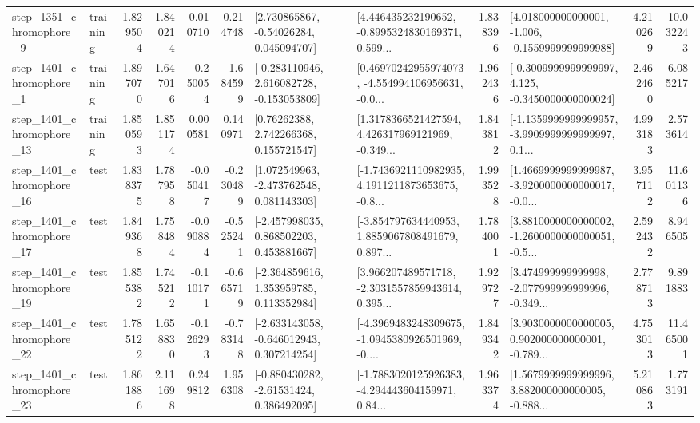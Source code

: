 \begin{tabular}{llrrrrllrlrr}
  step\_1351\_chromophore\_9 &  training &      1.829504 &    1.840214 &      0.010710 &  0.214748 &     [2.730865867, -0.54026284, 0.045094707] &  [4.446435232190652, -0.8995324830169371, 0.599... &       1.838396 &   [4.018000000000001, -1.006, -0.1559999999999988] &            4.210269 &         10.032243 \\
  step\_1401\_chromophore\_1 &  training &      1.897070 &    1.647016 &     -0.250054 & -1.684599 &   [-0.283110946, 2.616082728, -0.153053809] &  [0.46970242955974073, -4.554994106956631, -0.0... &       1.962436 &  [-0.3009999999999997, 4.125, -0.3450000000000024] &            2.462460 &          6.085217 \\
 step\_1401\_chromophore\_13 &  training &      1.850593 &    1.851174 &      0.000581 &  0.140971 &      [0.76262388, 2.742266368, 0.155721547] &  [1.3178366521427594, 4.426317969121969, -0.349... &       1.843812 &  [-1.1359999999999957, -3.9909999999999997, 0.1... &            4.993183 &          2.573614 \\
 step\_1401\_chromophore\_16 &      test &      1.838375 &    1.787958 &     -0.050417 & -0.230489 &    [1.072549963, -2.473762548, 0.081143303] &  [-1.7436921110982935, 4.1911211873653675, -0.8... &       1.993528 &  [1.4669999999999987, -3.9200000000000017, -0.0... &            3.957112 &         11.601136 \\
 step\_1401\_chromophore\_17 &      test &      1.849368 &    1.758484 &     -0.090884 & -0.525241 &    [-2.457998035, 0.868502203, 0.453881667] &  [-3.854797634440953, 1.8859067808491679, 0.897... &       1.784001 &  [3.8810000000000002, -1.2600000000000051, -0.5... &            2.592432 &          8.946505 \\
 step\_1401\_chromophore\_19 &      test &      1.855382 &    1.745212 &     -0.110171 & -0.665719 &    [-2.364859616, 1.353959785, 0.113352984] &  [3.966207489571718, -2.3031557859943614, 0.395... &       1.929727 &  [3.474999999999998, -2.077999999999996, -0.349... &            2.778713 &          9.891883 \\
 step\_1401\_chromophore\_22 &      test &      1.785122 &    1.658830 &     -0.126293 & -0.783148 &   [-2.633143058, -0.646012943, 0.307214254] &  [-4.3969483248309675, -1.0945380926501969, -0.... &       1.849342 &  [3.9030000000000005, 0.902000000000001, -0.789... &            4.753013 &         11.465001 \\
 step\_1401\_chromophore\_23 &      test &      1.861886 &    2.111698 &      0.249812 &  1.956308 &    [-0.880430282, -2.61531424, 0.386492095] &  [-1.7883020125926383, -4.294443604159971, 0.84... &       1.963374 &  [1.5679999999999996, 3.882000000000005, -0.888... &            5.210863 &          1.773191 \\

\end{tabular}
